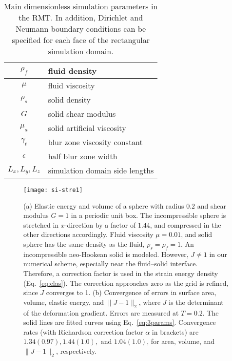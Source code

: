 \documentclass[times, 10pt]{article}
\begin{document}
            \begin{table}\centering
                \caption{Main dimensionless simulation parameters in the RMT.
                In addition, Dirichlet and Neumann boundary conditions can be specified for each face of the rectangular simulation domain.}
                \label{table:pars}

                \begin{tabular} { c || l }
                    \hline
                    $\rho_f$ 	& fluid density \\\hline
                    $\mu$       	& fluid viscosity \\\hline
                    $\rho_s$ 	& solid density \\\hline
                    $G$      		& solid shear modulus \\\hline
                    $\mu_a$ 	& solid artificial viscosity \\\hline
                    $\gamma_t$  & blur zone viscosity constant \\\hline
                    $\epsilon$ 	& half blur zone width\\\hline
                    $L_x, L_y, L_z$ & simulation domain side lengths \\\hline
                \end{tabular}
            \end{table}

            \begin{figure}
            \centering
                \texttt{[image: si-stre1]}
                \caption{ (a) Elastic energy and volume of a sphere with radius $0.2$ and shear modulus $G=1$ in a periodic unit box.
                The incompressible sphere is stretched in $x$-direction by a factor of $1.44$, and compressed in the other directions accordingly.
                 Fluid viscosity $\mu=0.01$, and solid sphere has the same density as the fluid, $\rho_s=\rho_f=1$.
                 An incompressible neo-Hookean solid is modeled.
                 However,  $J \ne 1$ in our numerical scheme, especially near the fluid--solid interface. Therefore, a correction factor is used in the strain energy density (Eq.~\eqref{eq:elas}).
                 The correction approaches zero as the grid is refined, since $J$ converges to 1.
                (b) Convergence of errors in surface area, volume, elastic energy, and $\|J-1\|_2$, where $J$ is the determinant of the deformation gradient.
                Errors are measured at $T=0.2$.
                The solid lines are fitted curves using Eq.~\eqref{eq:3params}.
                Convergence rates (with Richardson correction factor $\alpha$ in brackets) are $1.34 (0.97), 1.44 (1.0), \text{~and~} 1.04 (1.0)$, for area, volume, and $\|J-1\|_2$, respectively.}
                \label{fig:str_conv}
            \end{figure}
\end{document}
